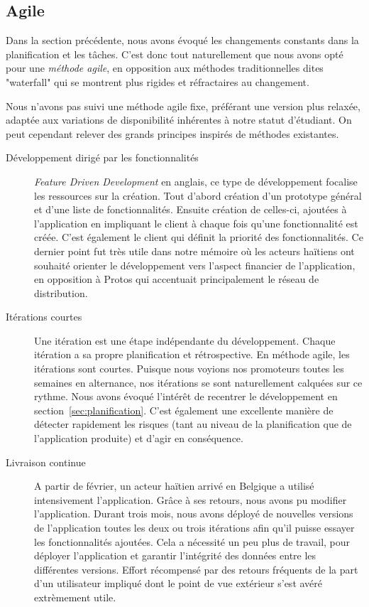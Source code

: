 \documentclass{EPL-master-thesis-covers-FR}
\begin{document}
			\subsection*{Agile}

				Dans la section précédente, nous avons évoqué les changements constants dans la planification et les tâches. C'est donc tout naturellement que nous avons opté pour une \emph{méthode agile}, en opposition aux méthodes traditionnelles dites "waterfall" qui se montrent plus rigides et réfractaires au changement.

				Nous n'avons pas suivi une méthode agile fixe, préférant une version plus relaxée, adaptée aux variations de disponibilité inhérentes à notre statut d'étudiant. On peut cependant relever des grands principes inspirés de méthodes existantes.

				\begin{description}
					\item[Développement dirigé par les fonctionnalités] \emph{Feature Driven Development} en anglais, ce type de développement focalise les ressources sur la création. Tout d'abord création d'un prototype général et d'une liste de fonctionnalités. Ensuite création de celles-ci, ajoutées à l'application en impliquant le client à chaque fois qu'une fonctionnalité est créée. C'est également le client qui définit la priorité des fonctionnalités. Ce dernier point fut très utile dans notre mémoire où les acteurs haïtiens ont souhaité orienter le développement vers l'aspect financier de l'application, en opposition à Protos qui accentuait principalement le réseau de distribution.

					\item[Itérations courtes] Une itération est une étape indépendante du développement. Chaque itération a sa propre planification et rétrospective. En méthode agile, les itérations sont courtes. Puisque nous voyions nos promoteurs toutes les semaines en alternance, nos itérations se sont naturellement calquées sur ce rythme. Nous avons évoqué l'intérêt de recentrer le développement en section~\ref{sec:planification}. C'est également une excellente manière de détecter rapidement les risques (tant au niveau de la planification que de l'application produite) et d'agir en conséquence.

					\item[Livraison continue] A partir de février, un acteur haïtien arrivé en Belgique a utilisé intensivement l'application. Grâce à ses retours, nous avons pu modifier l'application. Durant trois mois, nous avons déployé de nouvelles versions de l'application toutes les deux ou trois itérations afin qu'il puisse essayer les fonctionnalités ajoutées. Cela a nécessité un peu plus de travail, pour déployer l'application et garantir l'intégrité des données entre les différentes versions. Effort récompensé par des retours fréquents de la part d'un utilisateur impliqué dont le point de vue extérieur s'est avéré extrèmement utile.
				\end{description}
\end{document}
